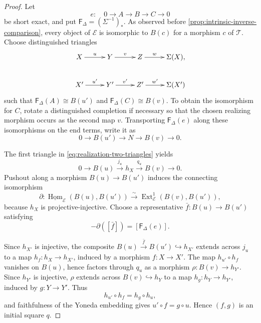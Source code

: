 \documentclass[a4paper,11pt,reqno]{amsart}
\theoremstyle{definition}
\theoremstyle{plain}
\numberwithin{equation}{section}
\newcommand{\T}{\mathcal T}
\newcommand{\Hom}{\operatorname{Hom}}
\newcommand{\Ext}{\operatorname{Ext}}
\begin{document}
\begin{proof}
Let
\[
 e:\quad0\longrightarrow A\longrightarrow B\longrightarrow C
 \longrightarrow0
\]
be short exact, and put \(\mathsf F_\Delta=(\Sigma^{-1})_*\).  As observed
before \cref{prop:intrinsic-inverse-comparison}, every object
of \(\mathcal E\) is isomorphic to \(B(c)\) for a morphism \(c\) of \(\T\).
Choose distinguished triangles
\begin{equation}
\label{eq:realization-two-triangles}
\xymatrix@C=2.2pc{
X\ar[r]^-{u}&Y\ar[r]^-{v}&Z\ar[r]^-{w}&\Sigma(X),\\
X'\ar[r]^-{u'}&Y'\ar[r]^-{v'}&Z'\ar[r]^-{w'}&\Sigma(X')
}
\end{equation}
such that \(\mathsf F_\Delta(A)\cong B(u')\) and
\(\mathsf F_\Delta(C)\cong B(v)\).  To obtain the isomorphism for \(C\), rotate a
distinguished completion if necessary so that the chosen realizing morphism
occurs as the second map \(v\).  Transporting \(\mathsf F_\Delta(e)\) along
these isomorphisms on the end terms, write it as
\begin{equation}
\label{eq:transported-short-exact-sequence}
 0\longrightarrow B(u')\longrightarrow N\longrightarrow B(v)
 \longrightarrow0.
\end{equation}

The first triangle in \eqref{eq:realization-two-triangles} yields
\[
 0\longrightarrow B(u)\xrightarrow{j_u}h_X
 \xrightarrow{q_u}B(v)\longrightarrow0.
\]
Pushout along a morphism \(B(u)\to B(u')\) induces the connecting
isomorphism
\begin{equation}
\label{eq:square-connecting-isomorphism}
 \partial:
 \underline{\Hom}_{\mathcal E}(B(u),B(u'))
 \xrightarrow{\sim}\Ext^1_{\mathcal E}(B(v),B(u')),
\end{equation}
because \(h_X\) is projective-injective.  Choose a representative
\(\bar f:B(u)\to B(u')\) satisfying
\begin{equation}
\label{eq:realization-extension-class}
 -\partial([\bar f])=[\mathsf F_\Delta(e)].
\end{equation}

Since \(h_{X'}\) is injective, the composite
\(B(u)\xrightarrow{\bar f}B(u')\hookrightarrow h_{X'}\) extends across
\(j_u\) to a map \(h_f:h_X\to h_{X'}\), induced by a morphism
\(f:X\to X'\).  The map \(h_{u'}\circ h_f\) vanishes on \(B(u)\), hence
factors through \(q_u\) as a morphism \(\rho:B(v)\to h_{Y'}\).  Since
\(h_{Y'}\) is injective, \(\rho\) extends across
\(B(v)\hookrightarrow h_Y\) to a map \(h_g:h_Y\to h_{Y'}\), induced by
\(g:Y\to Y'\).  Thus
\[
 h_{u'}\circ h_f=h_g\circ h_u,
\]
and faithfulness of the Yoneda embedding gives
\(u'\circ f=g\circ u\).  Hence \((f,g)\) is an initial square \(q\).


\end{proof}
\end{document}
